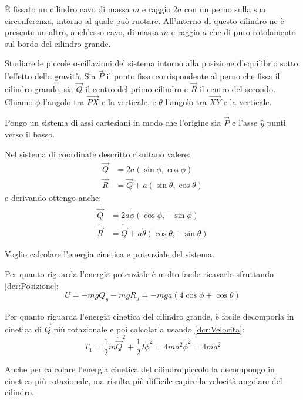 \documentclass[../main.tex]{subfiles}
\begin{document}
\textex
È fissato un cilindro cavo di massa $m$ e raggio $2a$ con un perno sulla sua circonferenza, intorno al quale può ruotare.
All'interno di questo cilindro ne è presente un altro, anch'esso cavo, di massa $m$ e raggio $a$ che di puro rotolamento sul bordo del cilindro grande.

Studiare le piccole oscillazioni del sistema intorno alla posizione d'equilibrio sotto l'effetto della gravità.
\solution
Sia $\vec P$ il punto fisso corrispondente al perno che fissa il cilindro grande, sia $\vec Q$ il centro del primo cilindro e $\vec R$ il centro del secondo. Chiamo $\phi$ l'angolo tra $\overrightarrow{PX}$ e la verticale, e $\theta$ l'angolo tra $\overrightarrow{XY}$ e la verticale.

Pongo un sistema di assi cartesiani in modo che l'origine sia $\vec P$ e l'asse $\hat y$ punti verso il basso.

Nel sistema di coordinate descritto risultano valere:
\begin{align}\label{dcr:Posizione}
	\vec Q&=2a(\sin\phi,\cos\phi) \\
	\vec R&=\vec Q + a(\sin\theta,\cos\theta)
\end{align}
e derivando ottengo anche:
\begin{align}\label{dcr:Velocita}
	\dot{\vec Q}&=2a\dot{\phi}(\cos\phi,-\sin\phi) \\
	\dot{\vec R}&=\dot{\vec Q} + a\dot{\theta}(\cos\theta,-\sin\theta)
\end{align}

Voglio calcolare l'energia cinetica e potenziale del sistema.

Per quanto riguarda l'energia potenziale è molto facile ricavarlo sfruttando \cref{dcr:Posizione}:
\begin{equation}
	U=-mgQ_y-mgR_y=-mga(4\cos\phi+\cos\theta)
\end{equation}

Per quanto riguarda l'energia cinetica del cilindro grande, è facile decomporla in cinetica di $\vec Q$ più rotazionale e poi calcolarla usando \cref{dcr:Velocita}:
\begin{equation}
	T_1=\frac 12 m {\dot{\vec Q}}^2+\frac 12I{\dot\phi}^2=4ma^2\dot\phi^2=4ma^2
\end{equation}

Anche per calcolare l'energia cinetica del cilindro piccolo la decompongo in cinetica più rotazionale, ma risulta più difficile capire la velocità angolare del cilindro.
\end{document}
